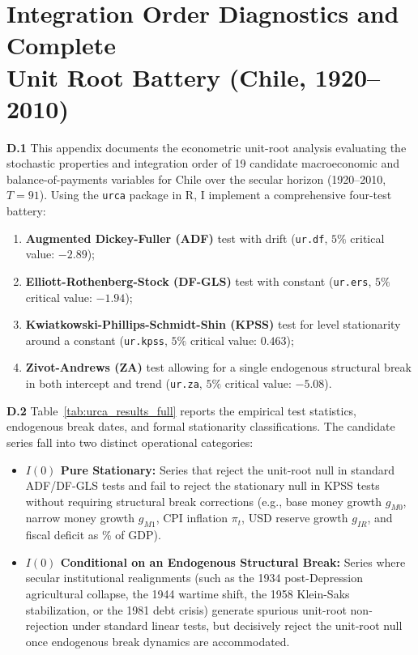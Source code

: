 \section[Integration Order Diagnostics and Unit Root Battery]{Integration Order Diagnostics and Complete\\Unit Root Battery (Chile, 1920--2010)}
\label{app:unit_root_battery}

\textbf{D.1} This appendix documents the econometric unit-root analysis evaluating the stochastic properties and integration order of 19 candidate macroeconomic and balance-of-payments variables for Chile over the secular horizon (1920--2010, $T=91$). Using the \texttt{urca} package in \textsf{R}, I implement a comprehensive four-test battery:
\begin{enumerate}[leftmargin=2em]
	\item \textbf{Augmented Dickey-Fuller (ADF)} test with drift (\texttt{ur.df}, $5\%$ critical value: $-2.89$);
	\item \textbf{Elliott-Rothenberg-Stock (DF-GLS)} test with constant (\texttt{ur.ers}, $5\%$ critical value: $-1.94$);
	\item \textbf{Kwiatkowski-Phillips-Schmidt-Shin (KPSS)} test for level stationarity around a constant (\texttt{ur.kpss}, $5\%$ critical value: $0.463$);
	\item \textbf{Zivot-Andrews (ZA)} test allowing for a single endogenous structural break in both intercept and trend (\texttt{ur.za}, $5\%$ critical value: $-5.08$).
\end{enumerate}

\textbf{D.2} Table~\ref{tab:urca_results_full} reports the empirical test statistics, endogenous break dates, and formal stationarity classifications. The candidate series fall into two distinct operational categories:
\begin{itemize}[leftmargin=2em]
	\item \textbf{$I(0)$ Pure Stationary:} Series that reject the unit-root null in standard ADF/DF-GLS tests and fail to reject the stationary null in KPSS tests without requiring structural break corrections (e.g., base money growth $g_{M0}$, narrow money growth $g_{M1}$, CPI inflation $\pi_t$, USD reserve growth $g_{IR}$, and fiscal deficit as \% of GDP).
	\item \textbf{$I(0)$ Conditional on an Endogenous Structural Break:} Series where secular institutional realignments (such as the 1934 post-Depression agricultural collapse, the 1944 wartime shift, the 1958 Klein-Saks stabilization, or the 1981 debt crisis) generate spurious unit-root non-rejection under standard linear tests, but decisively reject the unit-root null once endogenous break dynamics are accommodated.
\end{itemize}

